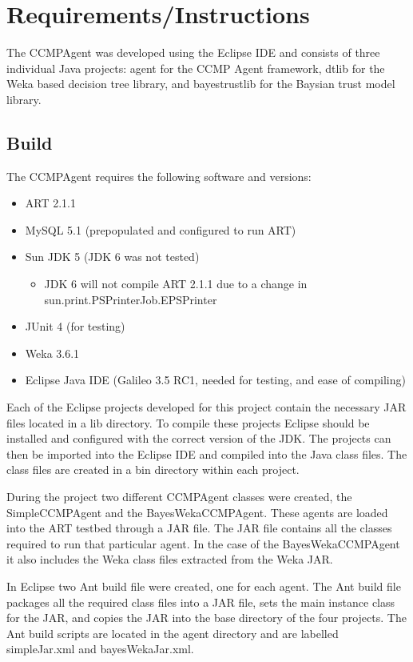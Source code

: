 \section{Requirements/Instructions}
The CCMPAgent was developed using the Eclipse IDE and consists of three
individual Java projects: agent for the CCMP Agent framework, dtlib for the
Weka based decision tree library, and bayestrustlib for the Baysian trust model
library.

\subsection{Build}
The CCMPAgent requires the following software and versions: 
\begin{itemize}
  \item ART 2.1.1
  \item MySQL 5.1 (prepopulated and configured to run ART)
  \item Sun JDK 5 (JDK 6 was not tested)
  \begin{itemize}
    \item JDK 6 will not compile ART 2.1.1 due to a change in
sun.print.PSPrinterJob.EPSPrinter
  \end{itemize}
  \item JUnit 4 (for testing)
  \item Weka 3.6.1
  \item Eclipse Java IDE (Galileo 3.5 RC1, needed for testing, and ease of
  compiling)
\end{itemize}

Each of the Eclipse projects developed for this project contain the necessary
JAR files located in a lib directory.  To compile these projects Eclipse should
be installed and configured with the correct version of the JDK.  The projects
can then be imported into the Eclipse IDE and compiled into the Java class
files.  The class files are created in a bin directory within each project.

During the project two different CCMPAgent classes were created, the
SimpleCCMPAgent and the BayesWekaCCMPAgent.  These agents are loaded into the
ART testbed through a JAR file.  The JAR file contains all the classes required
to run that particular agent.  In the case of the BayesWekaCCMPAgent it also
includes the Weka class files extracted from the Weka JAR.

In Eclipse two Ant build file were created, one for each agent.  The Ant build
file packages all the required class files into a JAR file, sets the main
instance class for the JAR, and copies the JAR into the base directory of the
four projects.  The Ant build scripts are located in the agent directory and
are labelled simpleJar.xml and bayesWekaJar.xml.

